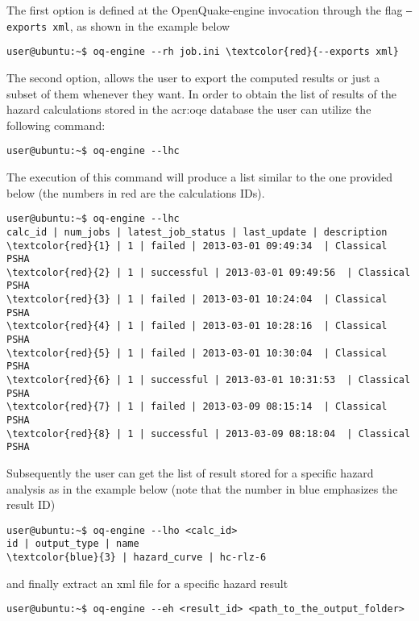 The first option is defined at the OpenQuake-engine invocation through 
the flag \texttt{--exports xml}, as shown in the example below
\begin{Verbatim}[frame=single, commandchars=\\\{\}, fontsize=\small]
user@ubuntu:~$ oq-engine --rh job.ini \textcolor{red}{--exports xml}
\end{Verbatim}

The second option, allows the user to export the computed results or just 
a subset of them whenever they want.
In order to obtain the list of results of the hazard calculations stored 
in the \gls{acr:oqe} database the user can utilize the following command:
\begin{Verbatim}[frame=single, commandchars=\\\{\}, fontsize=\small]
user@ubuntu:~$ oq-engine --lhc
\end{Verbatim}
The execution of this command will produce a list similar to the 
one provided below (the numbers in red are the calculations IDs).
\begin{Verbatim}[frame=single, commandchars=\\\{\}, fontsize=\small]
user@ubuntu:~$ oq-engine --lhc
calc_id | num_jobs | latest_job_status | last_update | description
\textcolor{red}{1} | 1 | failed | 2013-03-01 09:49:34  | Classical PSHA
\textcolor{red}{2} | 1 | successful | 2013-03-01 09:49:56  | Classical PSHA
\textcolor{red}{3} | 1 | failed | 2013-03-01 10:24:04  | Classical PSHA
\textcolor{red}{4} | 1 | failed | 2013-03-01 10:28:16  | Classical PSHA
\textcolor{red}{5} | 1 | failed | 2013-03-01 10:30:04  | Classical PSHA
\textcolor{red}{6} | 1 | successful | 2013-03-01 10:31:53  | Classical PSHA
\textcolor{red}{7} | 1 | failed | 2013-03-09 08:15:14  | Classical PSHA
\textcolor{red}{8} | 1 | successful | 2013-03-09 08:18:04  | Classical PSHA
\end{Verbatim}
Subsequently the user can get the list of result stored for a specific 
hazard analysis as in the example below (note that the number in blue 
emphasizes the result ID)
\begin{Verbatim}[frame=single, commandchars=\\\{\}, fontsize=\small]
user@ubuntu:~$ oq-engine --lho <calc_id>
id | output_type | name
\textcolor{blue}{3} | hazard_curve | hc-rlz-6
\end{Verbatim}
and finally extract an xml file for a specific hazard result 
\begin{Verbatim}[frame=single, commandchars=\\\{\}, fontsize=\small]
user@ubuntu:~$ oq-engine --eh <result_id> <path_to_the_output_folder>
\end{Verbatim}



